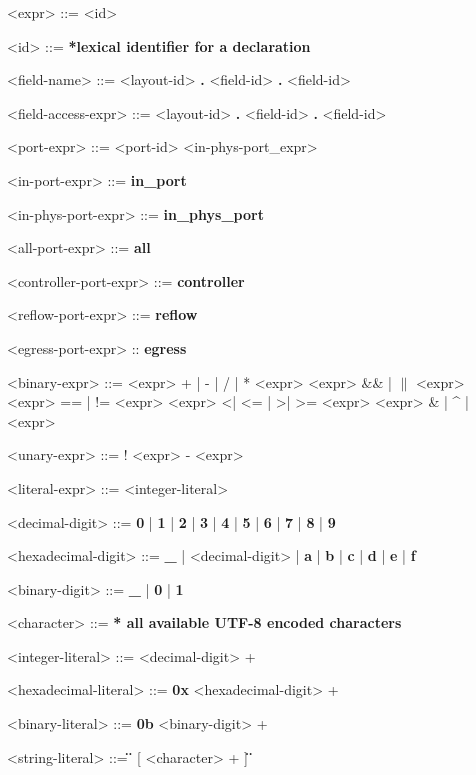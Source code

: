 \begin{mdframed}
\begin{grammar}

<expr> ::=
<id>

<id> ::= \textbf{*lexical identifier for a declaration}

<field-name> ::=
<layout-id> \textbf{.} <field-id>
 \textbf{.} <field-id>

<field-access-expr> ::=
<layout-id> \textbf{.} <field-id>
 \textbf{.} <field-id>

<port-expr> ::=
<port-id>
\alt <in-phys-port_expr>

<in-port-expr> ::= \textbf{in\_port}

<in-phys-port-expr> ::=  \textbf{in\_phys\_port}

<all-port-expr> ::= \textbf{all}

<controller-port-expr> ::= \textbf{controller}

<reflow-port-expr> ::= \textbf{reflow}

<egress-port-expr> :: \textbf{egress}

<binary-expr> ::= <expr>  + | - | / | *  <expr>
\alt <expr>  \&\& | $\|$  <expr>
\alt <expr> == | != <expr>
\alt <expr>  \textless | \textless= | \textgreater | \textgreater=  <expr>
\alt <expr>  \& | \string^ | \textbar  <expr>

<unary-expr> ::= 
! <expr>
\alt - <expr>

<literal-expr> ::=
<integer-literal>

<decimal-digit> ::= \textbf{0} | \textbf{1} | \textbf{2} | \textbf{3} | \textbf{4} | \textbf{5} | \textbf{6} | \textbf{7} | \textbf{8} | \textbf{9}

<hexadecimal-digit> ::= \textbf{\_} | <decimal-digit> | \textbf{a} | \textbf{b} | \textbf{c} | \textbf{d} | \textbf{e} | \textbf{f}             

<binary-digit> ::= \textbf{\_} | \textbf{0} | \textbf{1}

<character> ::= \textbf{* all available UTF-8 encoded characters}

<integer-literal> ::=
<decimal-digit> +

<hexadecimal-literal> ::=
\textbf{0x} <hexadecimal-digit> +

<binary-literal> ::=
\textbf{0b} <binary-digit> +

<string-literal> ::=
\textbf{\"} [ <character> + ] \textbf{\"} 

\end{grammar}
\end{mdframed}

